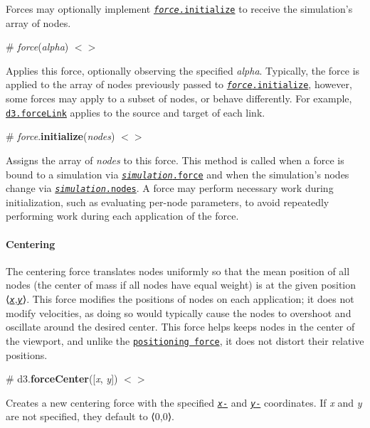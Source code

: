 Forces may optionally implement \href{#force_initialize}{\tt {\itshape force}.initialize} to receive the simulation’s array of nodes.

\label{__force}%
\# {\itshape force}({\itshape alpha}) \href{https://github.com/d3/d3-force/blob/master/src/simulation.js#L44}{\tt $<$$>$}

Applies this force, optionally observing the specified {\itshape alpha}. Typically, the force is applied to the array of nodes previously passed to \href{#force_initialize}{\tt {\itshape force}.initialize}, however, some forces may apply to a subset of nodes, or behave differently. For example, \href{#links}{\tt d3.\+force\+Link} applies to the source and target of each link.

\label{_force_initialize}%
\# {\itshape force}.{\bfseries initialize}({\itshape nodes}) \href{https://github.com/d3/d3-force/blob/master/src/simulation.js#L71}{\tt $<$$>$}

Assigns the array of {\itshape nodes} to this force. This method is called when a force is bound to a simulation via \href{#simulation_force}{\tt {\itshape simulation}.force} and when the simulation’s nodes change via \href{#simulation_nodes}{\tt {\itshape simulation}.nodes}. A force may perform necessary work during initialization, such as evaluating per-\/node parameters, to avoid repeatedly performing work during each application of the force.

\paragraph*{Centering}

The centering force translates nodes uniformly so that the mean position of all nodes (the center of mass if all nodes have equal weight) is at the given position ⟨\href{#center_x}{\tt {\itshape x}},\href{#center_y}{\tt {\itshape y}}⟩. This force modifies the positions of nodes on each application; it does not modify velocities, as doing so would typically cause the nodes to overshoot and oscillate around the desired center. This force helps keeps nodes in the center of the viewport, and unlike the \href{#positioning}{\tt positioning force}, it does not distort their relative positions.

\label{_forceCenter}%
\# d3.{\bfseries force\+Center}(\mbox{[}{\itshape x}, {\itshape y}\mbox{]}) \href{https://github.com/d3/d3-force/blob/master/src/center.js#L1}{\tt $<$$>$}

Creates a new centering force with the specified \href{#center_x}{\tt {\itshape x}-\/} and \href{#center_y}{\tt {\itshape y}-\/} coordinates. If {\itshape x} and {\itshape y} are not specified, they default to ⟨0,0⟩.

